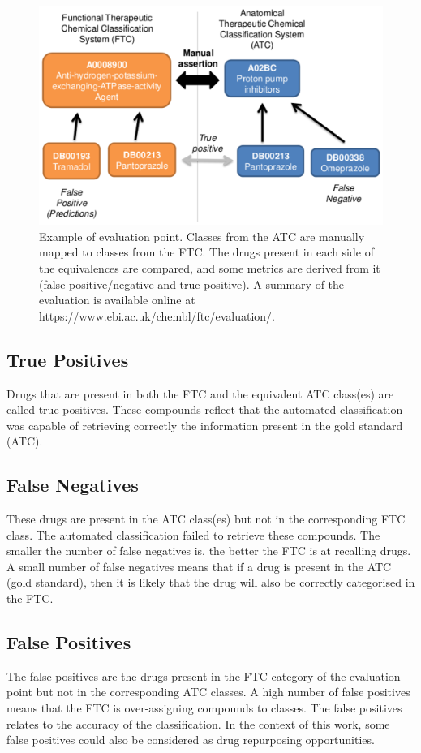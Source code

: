 \documentclass{bioinfo}
\begin{document}
\begin{figure}[!tpb]%
\centerline{\includegraphics{figS2.png}}
\caption{Example of evaluation point. Classes from the ATC are manually 
mapped to classes from the FTC. The drugs present in each side of the equivalences 
are compared, and some metrics are derived from it (false positive/negative and true positive). 
A summary of the evaluation is available online at {{https://www.ebi.ac.uk/chembl/ftc/evaluation/}}.}\label{fig:S02}
\end{figure}

\subsection{True Positives}
Drugs that are present in both the FTC and the equivalent ATC class(es) are called true positives. 
These compounds reflect that the automated classification was capable of retrieving correctly the 
information present in the gold standard (ATC).

\subsection{False Negatives}
These drugs are present in the ATC class(es) but not in the corresponding FTC class. 
The automated classification failed to retrieve these compounds. The smaller the number of 
false negatives is, the better the FTC is at recalling drugs. A small number of false negatives 
means that if a drug is present in the ATC (gold standard), then it is likely that the drug will 
also be correctly categorised in the FTC.

\subsection{False Positives}
The false positives are the drugs present in the FTC category of the evaluation point but not in the corresponding ATC classes. 
A high number of false positives means that the FTC is over-assigning compounds to classes.
The false positives relates to the accuracy of the classification. In the context of this work, 
some false positives could also be considered as drug repurposing opportunities.
\end{document}
